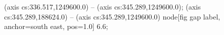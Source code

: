  (axis cs:336.517,1249600.0) -- (axis cs:345.289,1249600.0);
 (axis cs:345.289,188624.0) -- (axis cs:345.289,1249600.0)
  node[fig gap label, anchor=south east, pos=1.0] {\texttimes{}6.6};
